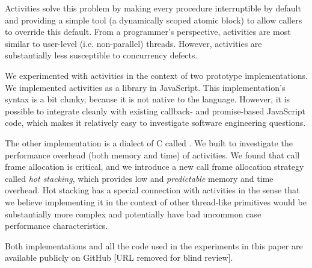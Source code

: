 \documentclass[a4paper,UKenglish,cleveref, autoref]{lipics-v2019}
\begin{document}
Activities solve this problem by making every procedure interruptible by default and providing a simple tool (a dynamically scoped atomic block) to allow callers to override this default.
From a programmer's perspective, activities are most similar to user-level (i.e. non-parallel) threads.
However, activities are substantially less susceptible to concurrency defects.

We experimented with activities in the context of two prototype implementations.
We implemented activities as a library in JavaScript.
This implementation's syntax is a bit clunky, because it is not native to the language.
However, it is possible to integrate cleanly with existing callback- and promise-based JavaScript code, which makes it relatively easy to investigate software engineering questions.

The other implementation is a dialect of C called \charcoal{}.
We built \charcoal{} to investigate the performance overhead (both memory and time) of activities.
We found that call frame allocation is critical, and we introduce a new call frame allocation strategy called \emph{hot stacking}, which provides low and \emph{predictable} memory and time overhead.
Hot stacking has a special connection with activities in the sense that we believe implementing it in the context of other thread-like primitives would be substantially more complex and potentially have bad uncommon case performance characteristics.

Both implementations and all the code used in the experiments in this paper are available publicly on GitHub [URL removed for blind review].


\end{document}
